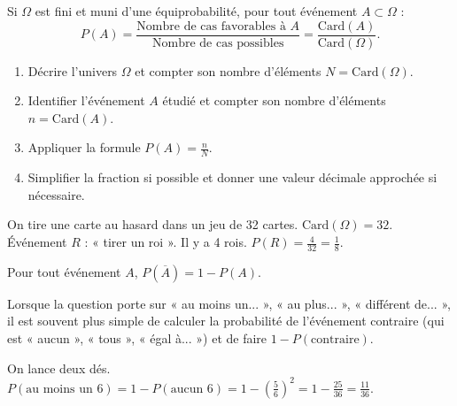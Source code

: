 \documentclass[11pt]{article}
\newcounter{popsec}
\newcounter{popsub}
\newcommand{\courssub}[1]{%
  \stepcounter{popsub}%
  \par\vspace{9pt}\noindent{\popxbold\fontsize{11.5}{13}\selectfont\color{popink}{\color{poporange}\thepopsec.\thepopsub}\hspace{6pt}#1}\par\nopagebreak\vspace{4pt}
}
\begin{document}
\begin{propriete}
Si $\Omega$ est fini et muni d'une équiprobabilité, pour tout événement $A \subset \Omega$ :
\[
P(A) = \frac{\text{Nombre de cas favorables à } A}{\text{Nombre de cas possibles}} = \frac{\text{Card}(A)}{\text{Card}(\Omega)}.
\]
\end{propriete}

\begin{methode}
\begin{enumerate}
\item Décrire l'univers $\Omega$ et compter son nombre d'éléments $N = \text{Card}(\Omega)$.
\item Identifier l'événement $A$ étudié et compter son nombre d'éléments $n = \text{Card}(A)$.
\item Appliquer la formule $P(A) = \frac{n}{N}$.
\item Simplifier la fraction si possible et donner une valeur décimale approchée si nécessaire.
\end{enumerate}
\end{methode}

\begin{exemplebox}
On tire une carte au hasard dans un jeu de 32 cartes. $\text{Card}(\Omega) = 32$.
Événement $R$ : « tirer un roi ». Il y a 4 rois. $P(R) = \frac{4}{32} = \frac{1}{8}$.
\end{exemplebox}

\courssub{Événement contraire}

\begin{propriete}
Pour tout événement $A$, $P(\overline{A}) = 1 - P(A)$.
\end{propriete}

\begin{methode}
Lorsque la question porte sur « au moins un... », « au plus... », « différent de... », il est souvent plus simple de calculer la probabilité de l'événement contraire (qui est « aucun », « tous », « égal à... ») et de faire $1 - P(\text{contraire})$.
\end{methode}

\begin{exemplebox}
On lance deux dés. $P(\text{au moins un 6}) = 1 - P(\text{aucun 6}) = 1 - \left(\frac{5}{6}\right)^2 = 1 - \frac{25}{36} = \frac{11}{36}$.
\end{exemplebox}
\end{document}
